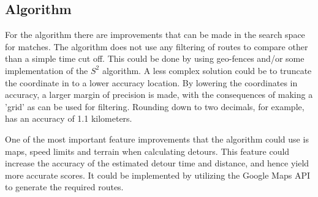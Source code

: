 \subsection{Algorithm}
For the algorithm there are improvements that can be made in the search space for matches.
The algorithm does not use any filtering of routes to compare other than a simple time cut off.
This could be done by using geo-fences and/or some implementation of the $S^2$ algorithm.
A less complex solution could be to truncate the coordinate in to a lower accuracy location.
By lowering the coordinates in accuracy, a larger margin of precision is made, with the consequences of making a 'grid' as can be used for filtering.
Rounding down to two decimals, for example, has an accuracy of 1.1 kilometers.

One of the most important feature improvements that the algorithm could use is maps, speed limits and terrain when calculating detours.
This feature could increase the accuracy of the estimated detour time and distance, and hence yield more accurate scores.
It could be implemented by utilizing the Google Maps API to generate the required routes.


